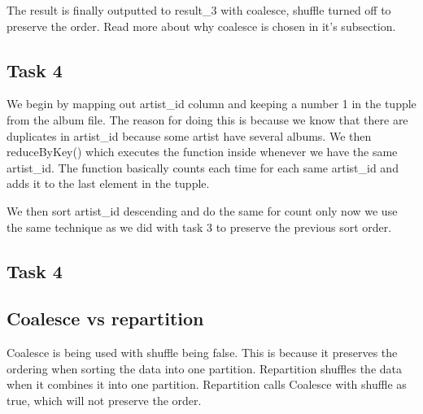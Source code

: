 \documentclass[12pt]{article}
\begin{document}
The result is finally outputted to result_3 with coalesce, shuffle turned off to preserve the order. Read more about why coalesce is chosen in it's subsection.

\subsection{Task 4}

We begin by mapping out artist_id column and keeping a number 1 in the tupple from the album file. The reason for doing this is because we know that there are duplicates in artist_id because some artist have several albums. We then reduceByKey() which executes the function inside whenever we have the same artist_id. The function basically counts each time for each same artist_id and adds it to the last element in the tupple. 

We then sort artist_id descending and do the same for count only now we use the same technique as we did with task 3 to preserve the previous sort order.

\subsection{Task 4}



\subsection{Coalesce vs repartition}

Coalesce is being used with shuffle being false. This is because it preserves the ordering when sorting the data into one partition. Repartition shuffles the data when it combines it into one partition. Repartition calls Coalesce with shuffle as true, which will not preserve the order.
\end{document}
